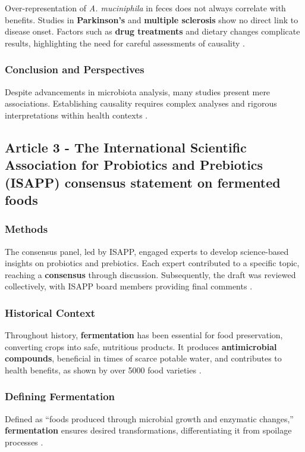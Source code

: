 Over-representation of \textit{A. muciniphila} in feces does not always correlate with benefits. Studies in \textbf{Parkinson's} and \textbf{multiple sclerosis} show no direct link to disease onset. Factors such as \textbf{drug treatments} and dietary changes complicate results, highlighting the need for careful assessments of causality \cite*{L9-HumanGut}.

\subsubsection*{Conclusion and Perspectives}
Despite advancements in microbiota analysis, many studies present mere associations. Establishing causality requires complex analyses and rigorous interpretations within health contexts \cite*{L9-HumanGut}.

\subsection{Article 3 - The International Scientific Association for Probiotics and Prebiotics (ISAPP) consensus statement on fermented foods}
\subsubsection*{Methods}
The consensus panel, led by ISAPP, engaged experts to develop science-based insights on probiotics and prebiotics. Each expert contributed to a specific topic, reaching a \textbf{consensus} through discussion. Subsequently, the draft was reviewed collectively, with ISAPP board members providing final comments \cite*{L9-ISAPP}.

\subsubsection*{Historical Context}
Throughout history, \textbf{fermentation} has been essential for food preservation, converting crops into safe, nutritious products. It produces \textbf{antimicrobial compounds}, beneficial in times of scarce potable water, and contributes to health benefits, as shown by over 5000 food varieties \cite*{L9-ISAPP}.

\subsubsection*{Defining Fermentation}
Defined as “foods produced through microbial growth and enzymatic changes,” \textbf{fermentation} ensures desired transformations, differentiating it from spoilage processes \cite*{L9-ISAPP}.

